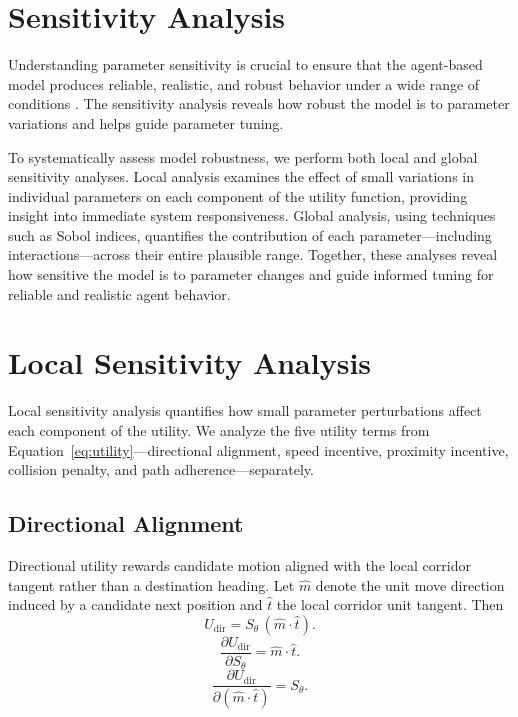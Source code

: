 \documentclass[conference]{IEEEtran}
\begin{document}
\clearpage

\appendices
\section{Sensitivity Analysis}

Understanding parameter sensitivity is crucial to ensure that the agent-based model produces reliable, realistic, and robust behavior under a wide range of conditions \cite{chandler1958traffic, talebpour2011multiregime}. The sensitivity analysis reveals how robust the model is to parameter variations and helps guide parameter tuning.

To systematically assess model robustness, we perform both local and global sensitivity analyses. Local analysis examines the effect of small variations in individual parameters on each component of the utility function, providing insight into immediate system responsiveness. Global analysis, using techniques such as Sobol indices, quantifies the contribution of each parameter---including interactions---across their entire plausible range. Together, these analyses reveal how sensitive the model is to parameter changes and guide informed tuning for reliable and realistic agent behavior.

\section{Local Sensitivity Analysis}

Local sensitivity analysis quantifies how small parameter perturbations affect each component of the utility. We analyze the five utility terms from Equation~\ref{eq:utility}---directional alignment, speed incentive, proximity incentive, collision penalty, and path adherence---separately.

\subsection*{Directional Alignment}
Directional utility rewards candidate motion aligned with the local corridor tangent rather than a destination heading. Let \(\hat{m}\) denote the unit move direction induced by a candidate next position and \(\hat{t}\) the local corridor unit tangent. Then
\begin{equation}
\label{eq:Udir}
U_{\mathrm{dir}}
= S_{\theta}\,(\hat{m}\cdot\hat{t}).
\end{equation}
\begin{equation}
\label{eq:dUdir_dStheta}
\frac{\partial U_{\mathrm{dir}}}{\partial S_{\theta}}
= \hat{m}\cdot\hat{t}.
\end{equation}
\begin{equation}
\label{eq:dUdir_dalignment}
\frac{\partial U_{\mathrm{dir}}}{\partial (\hat{m}\cdot\hat{t})}
= S_{\theta}.
\end{equation}
\end{document}
